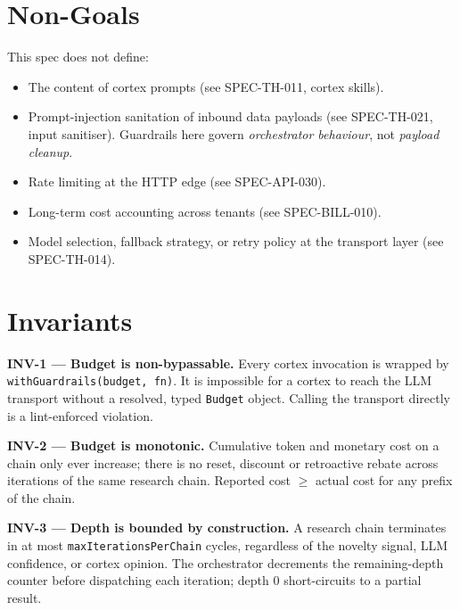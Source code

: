 \section{Non-Goals}
\begin{nongoal}
This spec does not define:
\begin{itemize}[leftmargin=1.2em]
  \item The content of cortex prompts (see SPEC-TH-011, cortex skills).
  \item Prompt-injection sanitation of inbound data payloads (see SPEC-TH-021, input sanitiser). Guardrails here govern \emph{orchestrator behaviour}, not \emph{payload cleanup}.
  \item Rate limiting at the HTTP edge (see SPEC-API-030).
  \item Long-term cost accounting across tenants (see SPEC-BILL-010).
  \item Model selection, fallback strategy, or retry policy at the transport layer (see SPEC-TH-014).
\end{itemize}
\end{nongoal}

\section{Invariants}

\begin{invariant}
\textbf{INV-1 --- Budget is non-bypassable.} Every cortex invocation is wrapped by \texttt{withGuardrails(budget, fn)}. It is impossible for a cortex to reach the LLM transport without a resolved, typed \texttt{Budget} object. Calling the transport directly is a lint-enforced violation.
\end{invariant}

\begin{invariant}
\textbf{INV-2 --- Budget is monotonic.} Cumulative token and monetary cost on a chain only ever increase; there is no reset, discount or retroactive rebate across iterations of the same research chain. Reported cost $\geq$ actual cost for any prefix of the chain.
\end{invariant}

\begin{invariant}
\textbf{INV-3 --- Depth is bounded by construction.} A research chain terminates in at most \texttt{maxIterationsPerChain} cycles, regardless of the novelty signal, LLM confidence, or cortex opinion. The orchestrator decrements the remaining-depth counter before dispatching each iteration; depth 0 short-circuits to a partial result.
\end{invariant}

